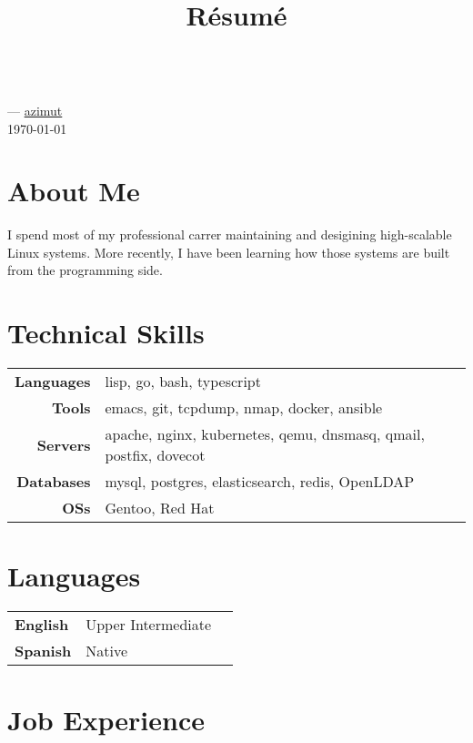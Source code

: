 \documentclass[11pt]{article}
\renewcommand{\maketitle}{
  \begin{center}{\huge\bfseries\theauthor} \\
    \vspace{.25em}
    {\faEnvelope} \href {mailto:\MAILTO} {\expandafter\randomize\expandafter{\MAILTO}}
    ---
    {\faGithub} \href {https://github.com/azimut} {azimut} \\
    \vspace{.25em}
    \today
  \end{center}
}
\begin{document}
\title{R\'esum\'e}
\author{\FULLNAME}

\maketitle


\section{About Me}

I spend most of my professional carrer maintaining and desigining high-scalable Linux systems. More recently, I have been learning how those systems are built from the programming side.


\section{Technical Skills}


\begin{tabular}{@{}rll@{}}
  \hspace{.1em} \textbf{Languages} & lisp, go, bash, typescript \\
  \hspace{.1em} \textbf{Tools}     & emacs, git, tcpdump, nmap, docker, ansible \\
  \hspace{.1em} \textbf{Servers}   & apache, nginx, kubernetes, qemu, dnsmasq, qmail, postfix, dovecot \\
  \hspace{.1em} \textbf{Databases} & mysql, postgres, elasticsearch, redis, OpenLDAP \\
  \hspace{.1em} \textbf{OSs}       & Gentoo, Red Hat
\end{tabular}


\section{Languages}


\begin{tabular}{@{}lll@{}}
  \hspace{.1em} \textbf{English} & Upper Intermediate \\
  \hspace{.1em} \textbf{Spanish} & Native \\
\end{tabular}


\section{Job Experience}
\end{document}
